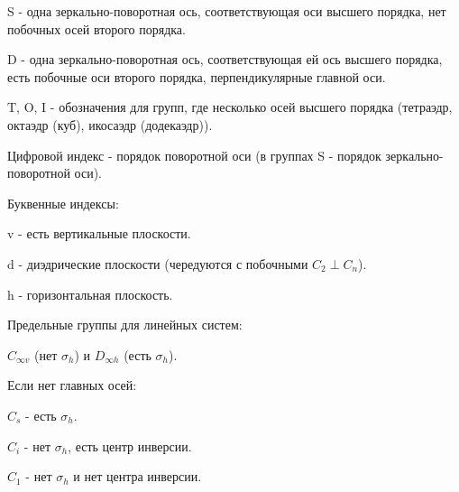 \par\smallskip


S - одна зеркально-поворотная ось, соответствующая оси высшего
порядка, нет побочных осей второго порядка.

\par\smallskip

D - одна зеркально-поворотная ось, соответствующая ей ось
высшего порядка, есть побочные оси второго порядка,
перпендикулярные главной оси.

\par\smallskip


T, O, I - обозначения для групп, где несколько осей высшего
порядка (тетраэдр, октаэдр (куб), икосаэдр (додекаэдр)). 

\par\smallskip	
	
Цифровой индекс - порядок поворотной оси (в группах S -
порядок зеркально-поворотной оси).

\par\smallskip

Буквенные индексы:	

\par\smallskip

v - есть вертикальные плоскости.

\par\smallskip

d - диэдрические плоскости (чередуются с побочными $C_2 \perp C_n$).

\par\smallskip

h - горизонтальная плоскость.

\par\smallskip
	
Предельные группы для линейных систем:

\par\smallskip

$C_{\infty v}$ (нет $\sigma _h$) и  $D_{\infty h}$ (есть $\sigma_h$).

\par\smallskip

Если нет главных осей:

\par\smallskip

$C_s$ - есть $\sigma _h$. 

\par\smallskip

$C_i$ - нет $\sigma _h$, есть центр инверсии.

\par\smallskip

$C_1$ - нет $\sigma _h$ и нет центра инверсии.

\par\bigskip
\par\bigskip
